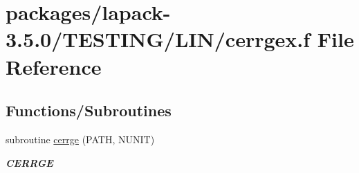 \hypertarget{cerrgex_8f}{}\section{packages/lapack-\/3.5.0/\+T\+E\+S\+T\+I\+N\+G/\+L\+I\+N/cerrgex.f File Reference}
\label{cerrgex_8f}
\subsection*{Functions/\+Subroutines}
\begin{DoxyCompactItemize}
\item 
subroutine \hyperlink{group__complex__lin_ga54ece51601cf2863111d777ce3e87bd1}{cerrge} (P\+A\+T\+H, N\+U\+N\+I\+T)
\begin{DoxyCompactList}\small\item\em {\bfseries C\+E\+R\+R\+G\+E} \end{DoxyCompactList}\end{DoxyCompactItemize}
